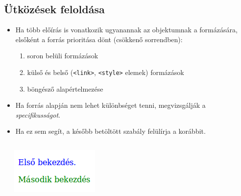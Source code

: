 \subsection{Ütközések feloldása}

\begin{frame}
  \begin{itemize}
    \item Ha több előírás is vonatkozik ugyanannak az objektumnak a formázására, elsőként a forrás prioritása dönt (csökkenő sorrendben):
    \begin{enumerate}
      \item soron belüli formázások
      \item külső és belső (\texttt{<link>}, \texttt{<style>} elemek) formázások
      \item böngésző alapértelmezése
    \end{enumerate}
    \item Ha forrás alapján nem lehet különbséget tenni, megvizsgálják a \emph{specifikusságot}.
    \item Ha ez sem segít, a később betöltött szabály felülírja a korábbit.
  \end{itemize}
  
\end{frame}

\begin{frame}
  \begin{exampleblock}{}
    \scriptsize
    
  \end{exampleblock}
  \begin{columns}[T]
      \begin{exampleblock}{}
        \scriptsize
        
      \end{exampleblock}
      \includegraphics[width=.66\textwidth]{utkozes1.png}
  \end{columns} 
\end{frame}


